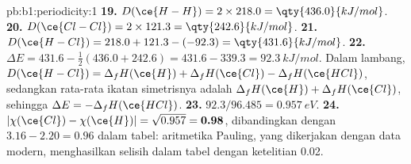\begin{solution}{pb:b1:periodicity:1}
\textbf{19.} $D(\ce{H-H}) = 2 \times 218.0 = \qty{436.0}{kJ/mol}$.
\textbf{20.} $D(\ce{Cl-Cl}) = 2 \times 121.3 = \qty{242.6}{kJ/mol}$.
\textbf{21.} $D(\ce{H-Cl}) = 218.0 + 121.3 - (-92.3) = \qty{431.6}{kJ/mol}$.
\textbf{22.} $\Delta E = 431.6 - \tfrac12(436.0 + 242.6) = 431.6 - 339.3 =
\qty{92.3}{kJ/mol}$. Dalam lambang, $D(\ce{H-Cl}) = \Delta_fH(\ce{H}) +
\Delta_fH(\ce{Cl}) - \Delta_fH(\ce{HCl})$, sedangkan rata-rata ikatan
simetrisnya adalah $\Delta_fH(\ce{H}) + \Delta_fH(\ce{Cl})$, sehingga
$\Delta E =
-\Delta_fH(\ce{HCl})$.
\textbf{23.} $92.3/96.485 = \qty{0.957}{eV}$.
\textbf{24.} $|\chi(\ce{Cl}) - \chi(\ce{H})| = \sqrt{0.957} =
\textbf{0.98}$, dibandingkan dengan $3.16 - 2.20 = 0.96$ dalam tabel:
aritmetika Pauling, yang dikerjakan dengan data modern, menghasilkan
selisih dalam tabel dengan ketelitian 0.02.
\end{solution}
